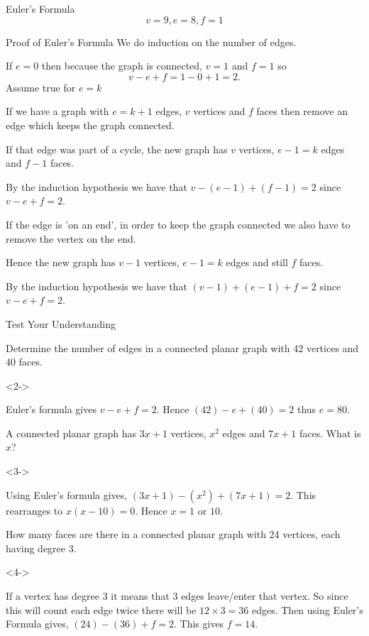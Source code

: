 \documentclass[8pt]{beamer}
\begin{document}
\begin{frame}{Euler's Formula}
\[v=9,e=8,f=1\]

\end{frame}

\begin{frame}{Proof of Euler's Formula}
	We do induction on the number of edges.

	If $e=0$ then because the graph is connected,  $v=1$ and  $f=1$ so
	 \[
	v-e+f=1-0+1=2
	.\] 
	Assume true for $e=k$
	
	If we have a graph with  $e=k+1$ edges, $v$ vertices and  $f$ faces then remove an edge which keeps the graph connected.

	If that edge was part of a cycle, the new graph has  $v$ vertices,  $e-1=k$ edges and $f-1$ faces.
	
	By the induction hypothesis we have that  $v-(e-1)+(f-1)=2$ since $v-e+f=2$.

	If the edge is 'on an end', in order to keep the graph connected we also have to remove the vertex on the end.

	Hence the new graph has  $v-1$ vertices,  $e-1=k$ edges and still  $f$ faces.

	By the induction hypothesis we have that  $(v-1) + (e-1)+f =2$ since $v-e+f=2$.


\end{frame}

\begin{frame}{Test Your Understanding}
	\begin{Problem}
		Determine the number of edges in a connected planar graph with 42 vertices and 40 faces.
	\end{Problem}
\begin{solution}<2->
	
	Euler's formula gives $v-e+f=2$. Hence  $(42)-e+(40)=2$ thus  $e=80$. 
\end{solution}
	\begin{Problem}
		A connected planar graph has $3x+1$ vertices,  $x^2$ edges and $7x+1$ faces. What is  $x$?
	\end{Problem}
\begin{solution}<3->
	
	Using Euler's formula gives, $(3x+1)-(x^2)+(7x+1)=2$. This rearranges to  $x(x-10)=0$. Hence  $x=1 \text{ or } 10$.
\end{solution}
	\begin{Problem}
		How many faces are there in a connected planar graph with 24 vertices, each having degree 3.
		
	\end{Problem}
\begin{solution}<4->
	
	If a vertex has degree 3 it means that 3 edges leave/enter that vertex. So since this will count each edge twice there will be $12 \times 3=36$ edges. Then using Euler's Formula gives,  $(24)-(36)+f=2$. This gives  $f=14$.
\end{solution}

\end{frame}
\end{document}
